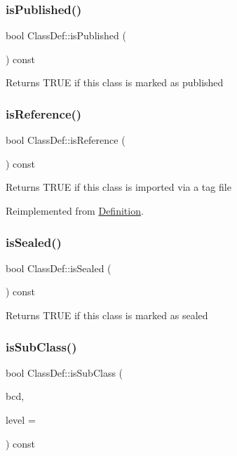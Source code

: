 \subsubsection{\texorpdfstring{isPublished()}{isPublished()}}
{\footnotesize\ttfamily bool Class\+Def\+::is\+Published (\begin{DoxyParamCaption}{ }\end{DoxyParamCaption}) const}

Returns T\+R\+UE if this class is marked as published \mbox{\label{class_class_def_a9a6dbef98acabb06d9e1792e3c82c800}} 
\subsubsection{\texorpdfstring{isReference()}{isReference()}}
{\footnotesize\ttfamily bool Class\+Def\+::is\+Reference (\begin{DoxyParamCaption}{ }\end{DoxyParamCaption}) const\hspace{0.3cm}{\ttfamily [virtual]}}

Returns T\+R\+UE if this class is imported via a tag file 

Reimplemented from \mbox{\hyperlink{class_definition_a8405121cdc0253ec9633a87500ac47ba}{Definition}}.

\mbox{\label{class_class_def_aca5d89dd62a87c6cfcb0752e4256fd5c}} 
\subsubsection{\texorpdfstring{isSealed()}{isSealed()}}
{\footnotesize\ttfamily bool Class\+Def\+::is\+Sealed (\begin{DoxyParamCaption}{ }\end{DoxyParamCaption}) const}

Returns T\+R\+UE if this class is marked as sealed \mbox{\label{class_class_def_a42fef1f090c9113234928afd7cb86507}} 
\subsubsection{\texorpdfstring{isSubClass()}{isSubClass()}}
{\footnotesize\ttfamily bool Class\+Def\+::is\+Sub\+Class (\begin{DoxyParamCaption}\item[{\mbox{\hyperlink{class_class_def}{Class\+Def}} $\ast$}]{bcd,  }\item[{int}]{level = {} }\end{DoxyParamCaption}) const}

